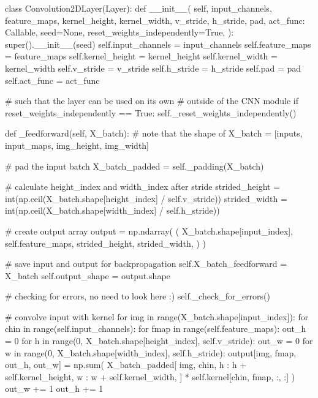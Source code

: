\documentclass[%
oneside,                 %
final,                   %
10pt]{article}
\begin{document}
\bpycod
class Convolution2DLayer(Layer):
    def __init__(
        self,
        input_channels,
        feature_maps,
        kernel_height,
        kernel_width,
        v_stride,
        h_stride,
        pad,
        act_func: Callable,
        seed=None,
        reset_weights_independently=True,
    ):
        super().__init__(seed)
        self.input_channels = input_channels
        self.feature_maps = feature_maps
        self.kernel_height = kernel_height
        self.kernel_width = kernel_width
        self.v_stride = v_stride
        self.h_stride = h_stride
        self.pad = pad
        self.act_func = act_func

        # such that the layer can be used on its own
        # outside of the CNN module
        if reset_weights_independently == True:
            self._reset_weights_independently()

    def _feedforward(self, X_batch):
        # note that the shape of X_batch = [inputs, input_maps, img_height, img_width]

        # pad the input batch
        X_batch_padded = self._padding(X_batch)

        # calculate height_index and width_index after stride
        strided_height = int(np.ceil(X_batch.shape[height_index] / self.v_stride))
        strided_width = int(np.ceil(X_batch.shape[width_index] / self.h_stride))

        # create output array
        output = np.ndarray(
            (
                X_batch.shape[input_index],
                self.feature_maps,
                strided_height,
                strided_width,
            )
        )

        # save input and output for backpropagation
        self.X_batch_feedforward = X_batch
        self.output_shape = output.shape

        # checking for errors, no need to look here :)
        self._check_for_errors()

        # convolve input with kernel
        for img in range(X_batch.shape[input_index]):
            for chin in range(self.input_channels):
                for fmap in range(self.feature_maps):
                    out_h = 0
                    for h in range(0, X_batch.shape[height_index], self.v_stride):
                        out_w = 0
                        for w in range(0, X_batch.shape[width_index], self.h_stride):
                            output[img, fmap, out_h, out_w] = np.sum(
                                X_batch_padded[
                                    img,
                                    chin,
                                    h : h + self.kernel_height,
                                    w : w + self.kernel_width,
                                ]
                                * self.kernel[chin, fmap, :, :]
                            )
                            out_w += 1
                        out_h += 1
\end{document}
